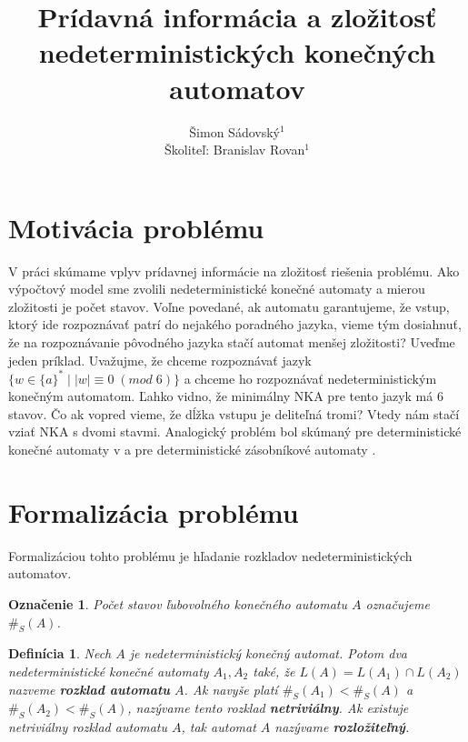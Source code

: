 \documentclass[myposter,portrait]{sciposter}
\def\mysection#1{
{\color{sectionCol}\section*{\sc\bfseries #1}}}
\newtheorem*{notation}{Označenie}
\newtheorem*{definition}{Definícia}
\begin{document}
\setlength{\logowidth}{20cm}
\setlength{\titlewidth}{\textwidth}
\addtolength{\titlewidth}{-\logowidth}
\useleftlogofalse

\color{textCol}

\title{Prídavná informácia a zložitosť nedeterministických konečných automatov}
\author{Šimon Sádovský$^1$\\
        Školiteľ: Branislav Rovan$^1$}
\maketitle

\begin{multicols*}{3}

\mysection{Motivácia problému}
V práci skúmame vplyv prídavnej informácie na zložitosť riešenia problému. Ako
výpočtový model sme zvolili nedeterministické konečné automaty a mierou zložitosti je
počet stavov. Voľne povedané, ak automatu garantujeme, že vstup, ktorý ide rozpoznávať patrí do nejakého poradného jazyka, vieme tým dosiahnuť, že na rozpoznávanie pôvodného jazyka stačí automat menšej zložitosti? Uveďme jeden príklad. Uvažujme, že chceme rozpoznávať jazyk $ \lbrace w \in \lbrace a \rbrace^* \; | \; |w| \equiv 0 \; (mod \; 6) \rbrace $ a chceme ho rozpoznávať nedeterministickým konečným automatom. Ľahko vidno, že minimálny NKA pre tento jazyk má 6 stavov. Čo ak vopred vieme, že dĺžka vstupu je deliteľná tromi? Vtedy nám stačí vziať NKA s dvomi stavmi. Analogický problém bol skúmaný pre deterministické konečné automaty v \cite{Gazi} a pre deterministické zásobníkové automaty \cite{Labath}.

\mysection{Formalizácia problému}

Formalizáciou tohto problému je hľadanie rozkladov nedeterministických automatov.
\\

\begin{notation}
Počet stavov ľubovolného konečného automatu $ A $ označujeme $ \#_S(A) $.\\
\end{notation}

\begin{definition}
Nech $ A $ je nedeterministický konečný automat. Potom dva nedeterministické konečné automaty $ A_1, A_2 $ také, že $ L(A)=L(A_1) \cap L(A_2) $ nazveme \textbf{rozklad automatu} $ A $. Ak navyše platí $ \#_S(A_1) < \#_S(A)$ a $ \#_S(A_2) < \#_S(A) $, nazývame tento rozklad \textbf{netriviálny}. Ak existuje netriviálny rozklad automatu $ A $, tak automat $ A $ nazývame \textbf{rozložiteľný}.\\
\end{definition}


\end{multicols*}
\end{document}
